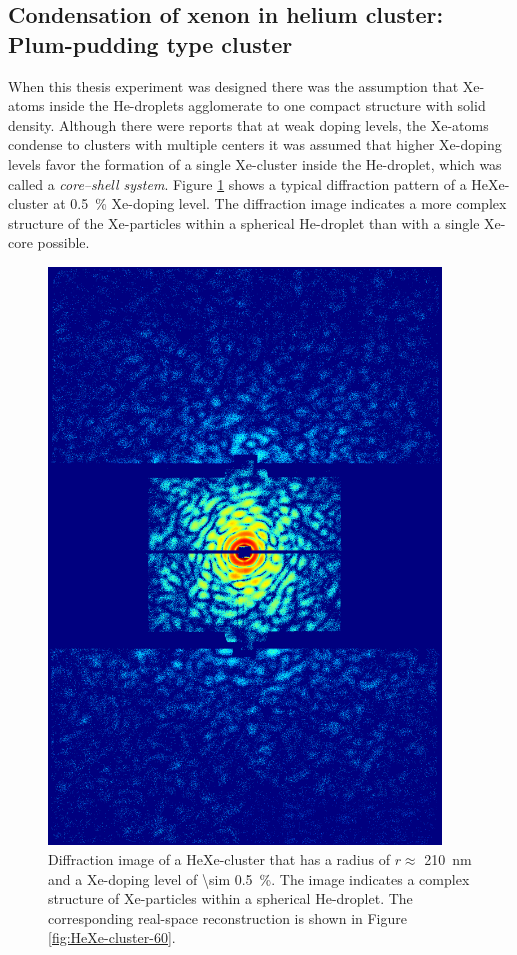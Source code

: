 \subsection{Condensation of xenon in helium cluster: Plum-pudding type cluster}\label{sec:helium-data}
%
When this thesis experiment was designed there was the assumption that Xe-atoms inside the He-droplets agglomerate to one compact structure with solid density. Although there were reports that at weak doping levels, the Xe-atoms condense to clusters with multiple centers \cite{Loginov-2011-PRL,Gomez-2014-Science} it was assumed that higher Xe-doping levels favor the formation of a single Xe-cluster inside the He-droplet, which was called a \textit{core--shell system}. Figure \ref{fig:HeXe-cluster-diff-patttern} shows a typical diffraction pattern of a HeXe-cluster at \SI{0.5}{\percent} Xe-doping level. The diffraction image indicates a more complex structure of the Xe-particles within a spherical He-droplet than with a single Xe-core possible.
%
\begin{figure}
 	\centering
 		\includegraphics[width=0.93\textwidth]{images/results/HeXediffPattern-113-05-doping-diffpattern.png}
 	\caption[Diffraction image of HeXe-cluster at \SI{0.5}{\percent} Xe-doping.]{Diffraction image of a HeXe-cluster that has a radius of $r\approx$ \SI{210}{\nano\meter} and a Xe-doping level of \SI{\sim 0.5}{\percent}. The image indicates a complex structure of Xe-particles within a spherical He-droplet. The corresponding real-space reconstruction is shown in Figure \ref{fig:HeXe-cluster-60}.}
 	\label{fig:HeXe-cluster-diff-patttern}
\end{figure}
